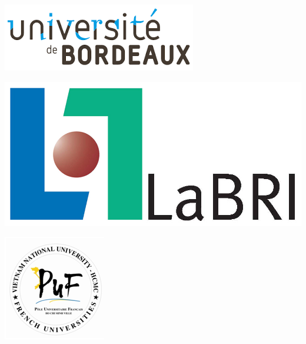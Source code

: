 \begin{titlepage}
\begin{center}
\noindent
\begin{minipage}{0.3\textwidth}
\begin{flushleft} \large
\includegraphics[scale=0.35]{./images/u_logo}
\end{flushleft}
\end{minipage}%
\begin{minipage}{0.3\textwidth}
\begin{flushright}
\begin{center}
\includegraphics[scale=0.25]{./images/logo-LaBRI}
\end{center}
\end{flushright}
\end{minipage}
\begin{minipage}{0.3\textwidth}
\begin{flushright}
\begin{center}
\includegraphics[scale=0.5]{./images/puf}
\end{center}
\end{flushright}
\end{minipage}

\end{center}
\end{titlepage}
